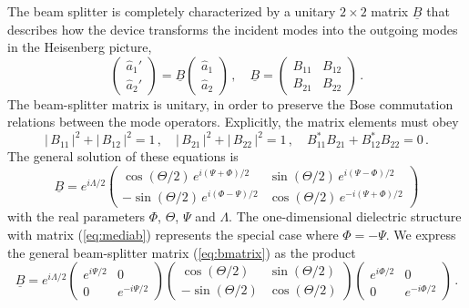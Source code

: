 \documentclass[12pt,amsmath,amssymb]{article}
\numberwithin{equation}{section}
\begin{document}
The beam splitter is completely characterized by a unitary
$2\times2$ matrix $\underline{B}$ that describes how the device
transforms the incident modes into the outgoing modes in the
Heisenberg picture,
\begin{equation}
\label{eq:bs} \left(
    \begin{array}{c}
     \hat{a}_1'  \\
     \hat{a}_2'
    \end{array}
\right) = \underline{B} \left(
    \begin{array}{c}
     \hat{a}_1  \\
     \hat{a}_2
    \end{array}
\right)\,,\quad \underline{B} = \left(
    \begin{array}{cc}
      B_{11} & B_{12} \\
      B_{21} & B_{22}
    \end{array}
\right)\,.
\end{equation}
The beam-splitter matrix is unitary, in order to preserve the
Bose commutation relations between the mode operators.
Explicitly, the matrix elements must obey
\begin{equation}
|\,B_{11}\,|^2+|\,B_{12}\,|^2=1\,,\quad
|\,B_{21}\,|^2+|\,B_{22}\,|^2=1\,,\quad
B_{11}^*B_{21}+B_{12}^*B_{22}=0\,.
\end{equation}
The general solution of these equations is
\begin{equation}
\label{eq:bmatrix} \underline{B} = e^{i\Lambda/2}\left(
    \begin{array}{cc}
      \cos(\Theta/2)\,e^{i(\Psi+\Phi)/2} &
      \sin(\Theta/2)\,e^{i(\Psi-\Phi)/2}  \\
      -\sin(\Theta/2)\,e^{i(\Phi-\Psi)/2}  &
      \cos(\Theta/2)\,e^{-i(\Psi+\Phi)/2}
    \end{array}
\right)
\end{equation}
with the real parameters $\Phi$, $\Theta$, $\Psi$ and $\Lambda$.
The one-dimensional dielectric structure with matrix
(\ref{eq:mediab}) represents the special case where $\Phi=-\Psi$.
We express the general beam-splitter matrix (\ref{eq:bmatrix}) as
the product
\begin{equation}
\label{eq:u2} \underline{B} = e^{i\Lambda/2} \left(
    \begin{array}{cc}
      e^{i\Psi/2} & 0 \\
      0 & e^{-i\Psi/2}
    \end{array}\right) \left(
    \begin{array}{cc}
      \cos(\Theta/2) & \sin(\Theta/2) \\
      -\sin(\Theta/2) & \cos(\Theta/2)
    \end{array}
\right)\left(
    \begin{array}{cc}
      e^{i\Phi/2} & 0 \\
      0 & e^{-i\Phi/2}
    \end{array}\right)\,.
\end{equation}
\end{document}
